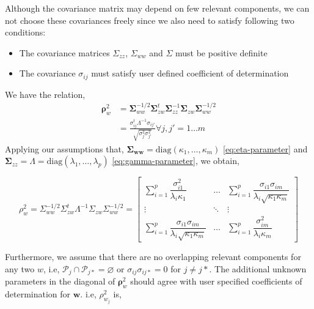 \documentclass[review]{elsarticle}
\providecommand{\tightlist}{%
  \setlength{\itemsep}{0pt}\setlength{\parskip}{0pt}}
\theoremstyle{definition}
\theoremstyle{definition}
\theoremstyle{definition}
\theoremstyle{remark}
\begin{document}
Although the covariance matrix may depend on few relevant components, we
can not choose these covariances freely since we also need to satisfy
following two conditions:

\begin{itemize}
\tightlist
\item
  The covariance matrices \(\Sigma_{zz}\), \(\Sigma_{ww}\) and
  \(\Sigma\) must be positive definite
\item
  The covariance \(\sigma_{ij}\) must satisfy user defined coefficient
  of determination
\end{itemize}

We have the relation, \[
  \begin{aligned}
    \boldsymbol{\rho}_w^2 &= 
    \boldsymbol{\Sigma}_{ww}^{-1/2}
    \boldsymbol{\Sigma}_{zw}^t
    \boldsymbol{\Sigma}_{zz}^{-1}
    \boldsymbol{\Sigma}_{zw}
    \boldsymbol{\Sigma}_{ww}^{-1/2} \\ &=
    \frac{\sigma_{ij}^t\Lambda^{-1}\sigma_{ij'}}
        {\sqrt{\sigma_{j}^2\sigma_{j'}^2}} \forall j, {j'} = 1 \ldots m
  \end{aligned}
\] Applying our assumptions that,
\(\boldsymbol{\Sigma_{ww}} = \text{diag}(\kappa_1, \ldots, \kappa_m)\)
\eqref{eq:eta-parameter} and
\(\boldsymbol{\Sigma}_{zz} = \Lambda = \text{diag}(\lambda_1, \ldots, \lambda_p)\)
\eqref{eq:gamma-parameter}, we obtain,

\[
  \rho_{w}^2 = \Sigma_{ww}^{-1/2}\Sigma_{zw}^t\Lambda^{-1}\Sigma_{zw}\Sigma_{ww}^{-1/2} = 
  \begin{bmatrix}
    \displaystyle\sum_{i = 1}^p\dfrac{\sigma_{i1}^2}{\lambda_i\kappa_1} & 
    \ldots &
    \displaystyle\sum_{i=1}^p\dfrac{\sigma_{i1}\sigma_{im}}{\lambda_i\sqrt{\kappa_1\kappa_m}} \\
    \vdots & \ddots & \vdots \\
    \displaystyle\sum_{i=1}^p\dfrac{\sigma_{i1}\sigma_{im}}{\lambda_i\sqrt{\kappa_1\kappa_m}} & 
    \ldots & 
    \displaystyle\sum_{i = 1}^p\dfrac{\sigma_{im}^2}{\lambda_i\kappa_m}
  \end{bmatrix} 
\]

Furthermore, we assume that there are no overlapping relevant components
for any two \(w\), i.e,
\(\mathcal{P}_j \cap \mathcal{P}_{j*} = \varnothing\) or
\(\sigma_{ij}\sigma_{ij*} = 0\) for \(j\ne j*\). The additional unknown
parameters in the diagonal of \(\boldsymbol{\rho}_w^2\) should agree
with user specified coefficients of determination for \(\mathbf{w}\).
i.e, \(\rho_{w_j}^2\) is,
\end{document}
